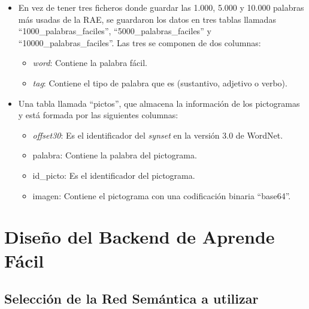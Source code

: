\begin{itemize}
	\item En vez de tener tres ficheros donde guardar las 1.000, 5.000 y 10.000 palabras más usadas de la RAE, se guardaron los datos en tres tablas llamadas ``1000\_palabras\_faciles'', ``5000\_palabras\_faciles'' y ``10000\_palabras\_faciles''. Las tres se componen de dos columnas:
	\begin{itemize}
		\item \textit{word}: Contiene la palabra fácil.  
		\item \textit{tag}: Contiene el tipo de palabra que es (sustantivo, adjetivo o verbo).
	\end{itemize} 
	 
	 
	\item Una tabla llamada ``pictos'', que almacena la información de los pictogramas y está formada por las siguientes columnas:
	\begin{itemize}
		\item \textit{offset30}: Es el identificador del \textit{synset} en la versión 3.0 de WordNet.
		\item palabra: Contiene la palabra del pictograma.
		\item id\_picto: Es el identificador del pictograma.
		\item imagen: Contiene el pictograma con una codificación binaria ``base64''.
	\end{itemize}

\end{itemize}


\section{Diseño del Backend de Aprende Fácil}

\subsection{Selección de la Red Semántica a utilizar}
\label{cap:subsec:redsemanticautilizada}

